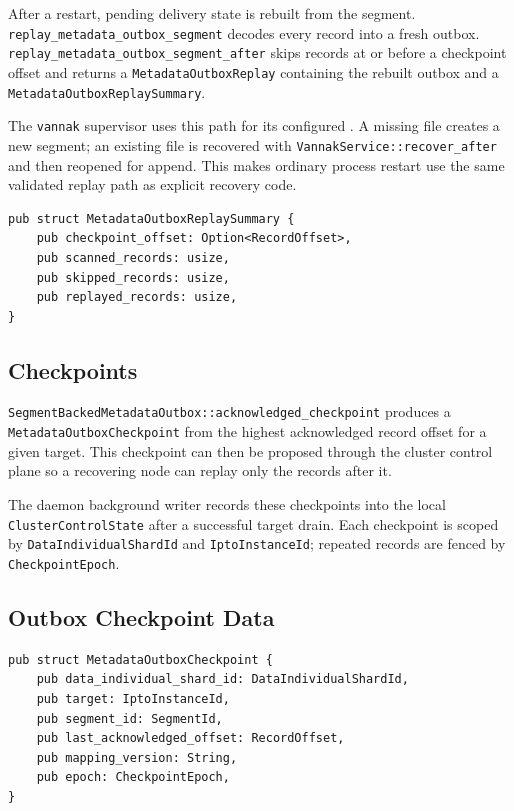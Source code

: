 After a restart, pending delivery state is rebuilt from the segment.
\texttt{replay\_metadata\_outbox\_segment} decodes every record into a fresh
outbox. \texttt{replay\_metadata\_outbox\_segment\_after} skips records at or
before a checkpoint offset and returns a \texttt{MetadataOutboxReplay} containing
the rebuilt outbox and a \texttt{MetadataOutboxReplaySummary}.

The \texttt{vannak} supervisor uses this path for its configured
. A missing file creates a new
segment; an existing file is recovered with \texttt{VannakService::recover\_after}
and then reopened for append. This makes ordinary process restart use the same
validated replay path as explicit recovery code.

\begin{lstlisting}
pub struct MetadataOutboxReplaySummary {
    pub checkpoint_offset: Option<RecordOffset>,
    pub scanned_records: usize,
    pub skipped_records: usize,
    pub replayed_records: usize,
}
\end{lstlisting}

\subsection{Checkpoints}

\texttt{SegmentBackedMetadataOutbox::acknowledged\_checkpoint} produces a
\texttt{MetadataOutboxCheckpoint} from the highest acknowledged record offset for
a given target. This checkpoint can then be proposed through the cluster control
plane so a recovering node can replay only the records after it.

The daemon background writer records these checkpoints into the local
\texttt{ClusterControlState} after a successful target drain. Each checkpoint is
scoped by \texttt{DataIndividualShardId} and \texttt{IptoInstanceId}; repeated
records are fenced by \texttt{CheckpointEpoch}.

\subsection{Outbox Checkpoint Data}

\begin{lstlisting}
pub struct MetadataOutboxCheckpoint {
    pub data_individual_shard_id: DataIndividualShardId,
    pub target: IptoInstanceId,
    pub segment_id: SegmentId,
    pub last_acknowledged_offset: RecordOffset,
    pub mapping_version: String,
    pub epoch: CheckpointEpoch,
}
\end{lstlisting}

